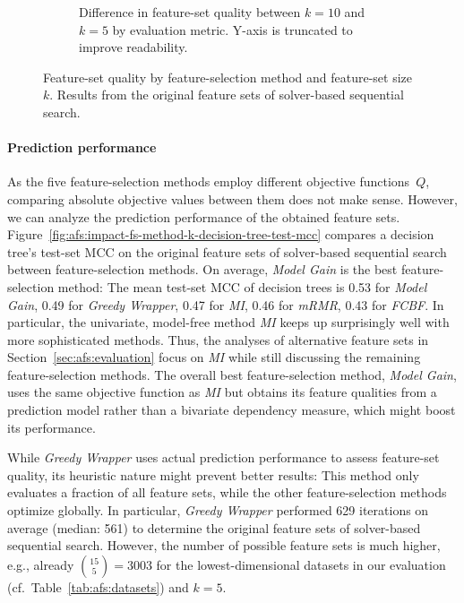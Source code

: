 \documentclass{article}
\theoremstyle{definition}
\begin{document}
\begin{figure}[t]
\begin{subfigure}[t]{0.48\textwidth}
		\caption{
			Difference in feature-set quality between $k=10$ and $k=5$ by evaluation metric.
			Y-axis is truncated to improve readability.
		}
		\label{fig:afs:impact-fs-method-k-metric-diff}
	\end{subfigure}
	\caption{
		Feature-set quality by feature-selection method and feature-set size~$k$.
		Results from the original feature sets of solver-based sequential search.
	}
	\label{fig:afs:impact-fs-method-k-quality}
\end{figure}

\paragraph{Prediction performance}

As the five feature-selection methods employ different objective functions~$Q$, comparing absolute objective values between them does not make sense.
However, we can analyze the prediction performance of the obtained feature sets.
Figure~\ref{fig:afs:impact-fs-method-k-decision-tree-test-mcc} compares a decision tree's test-set MCC on the original feature sets of solver-based sequential search between feature-selection methods.
On average, \emph{Model Gain} is the best feature-selection method:
The mean test-set MCC of decision trees is 0.53 for \emph{Model Gain}, 0.49 for \emph{Greedy Wrapper}, 0.47 for \emph{MI}, 0.46 for \emph{mRMR}, 0.43 for \emph{FCBF}.
In particular, the univariate, model-free method \emph{MI} keeps up surprisingly well with more sophisticated methods.
Thus, the analyses of alternative feature sets in Section~\ref{sec:afs:evaluation} focus on \emph{MI} while still discussing the remaining feature-selection methods.
The overall best feature-selection method, \emph{Model Gain}, uses the same objective function as \emph{MI} but obtains its feature qualities from a prediction model rather than a bivariate dependency measure, which might boost its performance. 

While \emph{Greedy Wrapper} uses actual prediction performance to assess feature-set quality, its heuristic nature might prevent better results:
This method only evaluates a fraction of all feature sets, while the other feature-selection methods optimize globally.
In particular, \emph{Greedy Wrapper} performed 629 iterations on average (median: 561) to determine the original feature sets of solver-based sequential search.
However, the number of possible feature sets is much higher, e.g., already $\binom{15}{5} = 3003$ for the lowest-dimensional datasets in our evaluation (cf.~Table~\ref{tab:afs:datasets}) and $k=5$.
\end{document}
